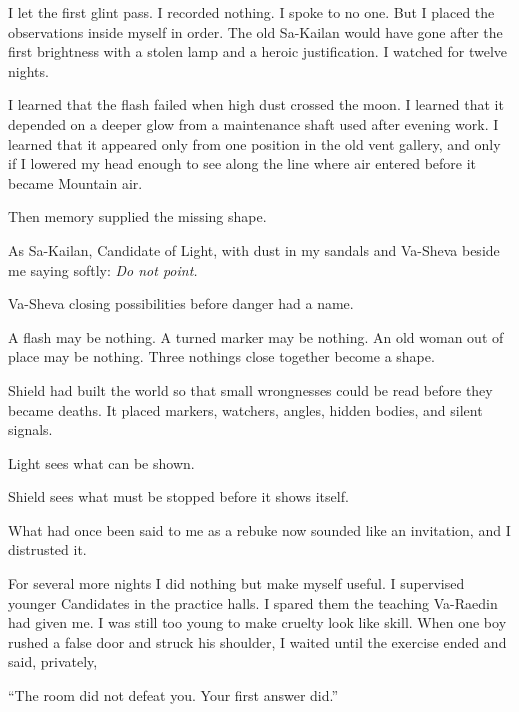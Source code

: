 I let the first glint pass. I recorded nothing. I spoke to no one. But I placed the observations inside myself in order. The old Sa-Kailan would have gone after the first brightness with a stolen lamp and a heroic justification. I watched for twelve nights.\par

I learned that the flash failed when high dust crossed the moon. I learned that it depended on a deeper glow from a maintenance shaft used after evening work. I learned that it appeared only from one position in the old vent gallery, and only if I lowered my head enough to see along the line where air entered before it became Mountain air.\par

Then memory supplied the missing shape.\par

As Sa-Kailan, Candidate of Light, with dust in my sandals and Va-Sheva beside me saying softly: \textit{Do not point.}\par

Va-Sheva closing possibilities before danger had a name.\par

A flash may be nothing. A turned marker may be nothing. An old woman out of place may be nothing. Three nothings close together become a shape.\par

Shield had built the world so that small wrongnesses could be read before they became deaths. It placed markers, watchers, angles, hidden bodies, and silent signals.\par

Light sees what can be shown.\par

Shield sees what must be stopped before it shows itself.\par

What had once been said to me as a rebuke now sounded like an invitation, and I distrusted it.\par

For several more nights I did nothing but make myself useful. I supervised younger Candidates in the practice halls. I spared them the teaching Va-Raedin had given me. I was still too young to make cruelty look like skill. When one boy rushed a false door and struck his shoulder, I waited until the exercise ended and said, privately,\par

``The room did not defeat you. Your first answer did.''\par

